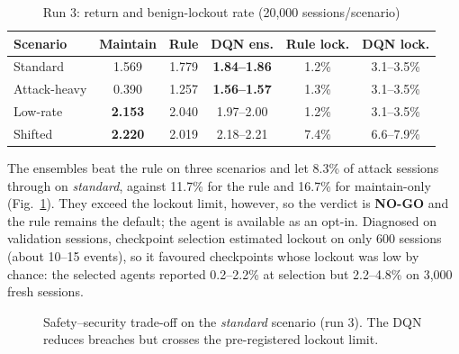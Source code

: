 \documentclass[conference]{IEEEtran}
\begin{document}
\begin{table}[t]
\caption{Run 3: return and benign-lockout rate (20{,}000 sessions/scenario)}
\label{tab:rl3}
\centering
\footnotesize
\setlength{\tabcolsep}{3.5pt}
\begin{tabular}{lccccc}
\toprule
Scenario & Maintain & Rule & DQN ens. & Rule lock. & DQN lock. \\
\midrule
Standard & 1.569 & 1.779 & \textbf{1.84--1.86} & 1.2\% & 3.1--3.5\% \\
Attack-heavy & 0.390 & 1.257 & \textbf{1.56--1.57} & 1.3\% & 3.1--3.5\% \\
Low-rate & \textbf{2.153} & 2.040 & 1.97--2.00 & 1.2\% & 3.1--3.5\% \\
Shifted & \textbf{2.220} & 2.019 & 2.18--2.21 & 7.4\% & 6.6--7.9\% \\
\bottomrule
\end{tabular}
\end{table}

The ensembles beat the rule on three scenarios and let 8.3\% of attack
sessions through on \emph{standard}, against 11.7\% for the rule and 16.7\%
for maintain-only (Fig.~\ref{fig:tradeoff}). They exceed the lockout limit,
however, so the verdict is \textbf{NO-GO} and the rule remains the default;
the agent is available as an opt-in. Diagnosed on validation sessions,
checkpoint selection estimated lockout on only 600 sessions (about 10--15
events), so it favoured checkpoints whose lockout was low by chance: the
selected agents reported 0.2--2.2\% at selection but 2.2--4.8\% on 3{,}000
fresh sessions.

\begin{figure}[t]
\centering
{}
\caption{Safety--security trade-off on the \emph{standard} scenario (run 3).
The DQN reduces breaches but crosses the pre-registered lockout limit.}
\label{fig:tradeoff}
\end{figure}
\end{document}
